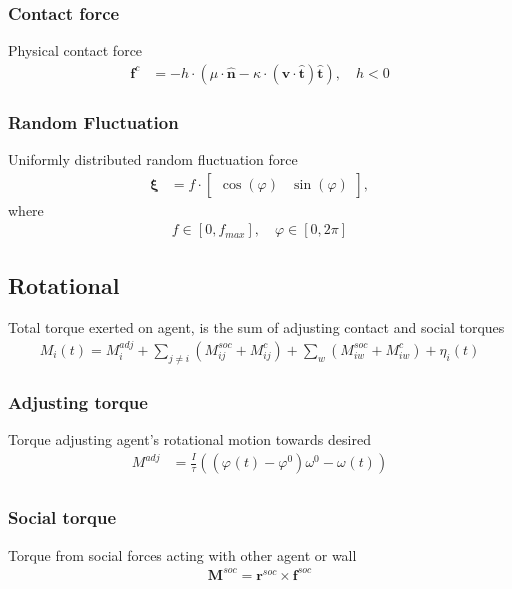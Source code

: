 \subsubsection{Contact force}
Physical contact force
\begin{align}
\mathbf{f}^{c} &= - h \cdot \left(\mu \cdot \hat{\mathbf{n}} - \kappa \cdot (\mathbf{v} \cdot \hat{\mathbf{t}}) \hat{\mathbf{t}}\right), \quad h < 0
\end{align}


\subsubsection{Random Fluctuation}
Uniformly distributed random fluctuation force
\begin{align}
\boldsymbol{\xi} &= f \cdot \begin{bmatrix} \cos(\varphi) & \sin(\varphi) \end{bmatrix},
\end{align}
where
\begin{align}
f \in [0, f_{max}],\quad \varphi \in [0, 2 \pi]
\end{align}


\subsection{Rotational}
Total torque exerted on agent, is the sum of adjusting contact and social torques
\begin{align}
M_{i}(t) = M_{i}^{adj} + \sum_{j\neq i}^{} \left(M_{ij}^{soc} + M_{ij}^{c}\right) + \sum_{w}^{} \left(M_{iw}^{soc} + M_{iw}^{c}\right) + \eta_{i}(t)
\end{align}


\subsubsection{Adjusting torque}
Torque adjusting agent's rotational motion towards desired
\begin{align}
M_{}^{adj} &= \frac{I_{}}{\tau_{}} \left((\varphi_{}(t) - \varphi_{}^{0}) \omega_{}^{0} - \omega_{}(t)\right) \\
\end{align}

\subsubsection{Social torque}
Torque from social forces acting with other agent or wall
\begin{align}
\mathbf{M}_{}^{soc} = \mathbf{r}_{}^{soc} \times \mathbf{f}_{}^{soc}
\end{align}

